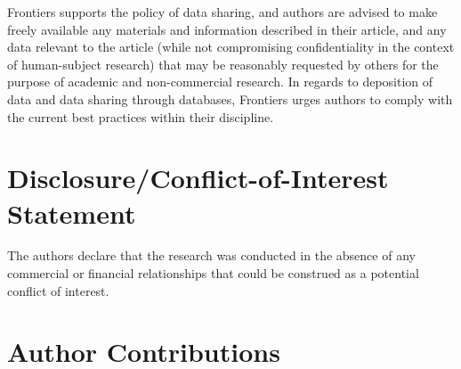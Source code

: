 \documentclass{frontiersSCNS} %
\begin{document}
Frontiers supports the policy of data sharing, and authors are advised to make freely available any materials and information described in their article, and any data relevant to the article (while not compromising confidentiality in the context of human-subject research) that may be reasonably requested by others for the purpose of academic and non-commercial research. In regards to deposition of data and data sharing through databases, Frontiers urges authors to comply with the current best practices within their discipline.

\section*{Disclosure/Conflict-of-Interest Statement}

The authors declare that the research was conducted in the absence of any commercial or financial relationships that could be construed as a potential conflict of interest.

\section*{Author Contributions}
\end{document}
